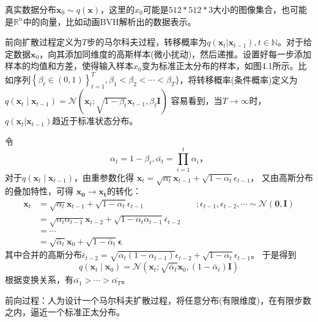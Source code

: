 \documentclass[lang=cn,newtx,10pt,scheme=chinese]{elegantbook}
\begin{document}
真实数据分布$\mathbf{x}_0 \sim q (\mathbf{x})$，这里的$x_0$可能是$512*512*3$大小的图像集合，也可能是$\mathbb{R}^{n}$中的向量，比如动画BVH解析出的数据表示。

前向扩散过程定义为$T$步的马尔科夫过程，转移概率为$q(\mathbf{x}_t|\mathbf{x}_{t-1}), t \in \mathbb{N}$。对于给定数据$\mathbf{x}_0$，向其添加同维度的高斯样本(微小扰动)，然后递推。设置好每一步添加样本的均值和方差，使得输入样本$x_0$变为标准正太分布的样本，如图4.1所示。比如序列$\left\{\beta_t \in(0,1)\right\}_{t=1}^T, \beta_1 < \beta_2 < \cdots < \beta_T\}$，将转移概率(条件概率)定义为$q\left(\mathbf{x}_t \mid \mathbf{x}_{t-1}\right)=\mathcal{N}\left(\mathbf{x}_t ; \sqrt{1-\beta_t} \mathbf{x}_{t-1}, \beta_t \mathbf{I}\right)$ 容易看到，当$T \rightarrow \infty$时，$q(\mathbf{x}_t|\mathbf{x}_{t-1})$趋近于标准状态分布。

令
\begin{equation}
\alpha_t = 1 - \beta_t, \bar{\alpha_{t}} = \prod_{i=1}^{t}\alpha_i，
\end{equation}
对于$q\left(\mathbf{x}_t \mid \mathbf{x}_{t-1}\right)$，由重参数化得
$\mathbf{x}_t =\sqrt{\alpha_t} \mathbf{x}_{t-1}+\sqrt{1-\alpha_t} \epsilon_{t-1}$，
又由高斯分布的叠加特性，可得
$\mathbf{x_0} \rightarrow \mathbf{x_t}$的转化：
\begin{equation}
\begin{array}{rlr}
\mathbf{x}_t & =\sqrt{\alpha_t} \mathbf{x}_{t-1}+\sqrt{1-\alpha_t} \epsilon_{t-1} & \quad ;  \epsilon_{t-1}, \epsilon_{t-2}, \cdots \sim \mathcal{N}(\mathbf{0}, \mathbf{I}) \\
& =\sqrt{\alpha_t \alpha_{t-1}} \mathbf{x}_{t-2}+\sqrt{1-\alpha_t \alpha_{t-1}} \bar{\epsilon}_{t-2}  \\
& =\cdots & \\
& =\sqrt{\bar{\alpha}_t} \mathbf{x}_0+\sqrt{1-\bar{\alpha}_t} \boldsymbol{\epsilon}
\end{array}
\end{equation}
其中合并的高斯分布$\bar{\epsilon}_{t-2} = \sqrt{\alpha_{t}(1-\alpha_{t-1})}\epsilon_{t-2} + \sqrt{1-\alpha_t}\epsilon_{t-1}$。
于是得到
\begin{equation}
q\left(\mathbf{x}_t \mid \mathbf{x}_0\right)=\mathcal{N}\left(\mathbf{x}_t ; \sqrt{\bar{\alpha}_t} \mathbf{x}_0,\left(1-\bar{\alpha}_t\right) \mathbf{I}\right)
\end{equation}
根据变换关系，有$\bar{\alpha_1} > \cdots > \bar{\alpha_T}$。

前向过程：人为设计一个马尔科夫扩散过程，将任意分布(有限维度)，在有限步数之内，逼近一个标准正太分布。
\end{document}
